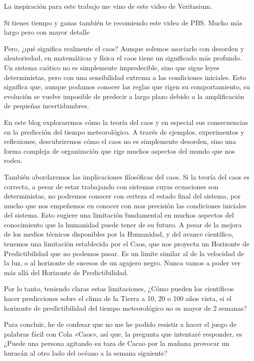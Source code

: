 \documentclass[
  10pt,
  a4paper,
  DIV=11,
  numbers=noendperiod,
  open=any]{scrreprt}
\numberwithin{equation}{chapter}
\numberwithin{equation}{chapter}
\renewcommand{\[}{\begin{equation}}
\renewcommand{\]}{\end{equation}}
\begin{document}
La inspiración para este trabajo me vino de este video de Veritasium.

Si tienes tiempo y ganas también te recomiendo este video de PBS. Mucho
más largo pero con mayor detalle

Pero, ¿qué significa realmente el caos? Aunque solemos asociarlo con
desorden y aleatoriedad, en matemáticas y física el caos tiene un
significado más profundo. Un sistema caótico no es simplemente
impredecible, sino que sigue leyes deterministas, pero con una
sensibilidad extrema a las condiciones iniciales. Esto significa que,
aunque podamos conocer las reglas que rigen su comportamiento, su
evolución se vuelve imposible de predecir a largo plazo debido a la
amplificación de pequeñas incertidumbres.

En este blog exploraremos cómo la teoría del caos y en especial sus
consecuencias en la predicción del tiempo meteorológico. A través de
ejemplos, experimentos y reflexiones, descubriremos cómo el caos no es
simplemente desorden, sino una forma compleja de organización que rige
muchos aspectos del mundo que nos rodea.

También abordaremos las implicaciones filosóficas del caos. Si la teoría
del caos es correcta, a pesar de estar trabajando con sistemas cuyas
ecuaciones son deterministas, no podremos conocer con certeza el estado
final del sistema, por mucho que nos empeñemos en conocer con mas
precisión las condiciones iniciales del sistema. Esto sugiere una
limitación fundamental en muchos aspectos del conocimiento que la
humanidad puede tener de su futuro. A pesar de la mejora de los medios
técnicos disponibles por la Humanidad, y del avance científico, tenemos
una limitación establecida por el Caos, que nos proyecta un Horizonte de
Predictibilidad que no podemos pasar. Es un limite similar al de la
velocidad de la luz, o al horizonte de sucesos de un agujero negro.
Nunca vamos a poder ver más allá del Horizonte de Predictibilidad.

Por lo tanto, teniendo claras estas limitaciones, ¿Cómo pueden los
científicos hacer predicciones sobre el clima de la Tierra a 10, 20 o
100 años vista, si el horizonte de predictibilidad del tiempo
meteorológico no es mayor de 2 semanas?

Para concluir, he de confesar que no me he podido resistir a hacer el
juego de palabras fácil con Cola «Caos», así que, la pregunta que
intentaré responder, es ¿Puede una persona agitando su taza de Cacao por
la mañana provocar un huracán al otro lado del océano a la semana
siguiente?
\end{document}
